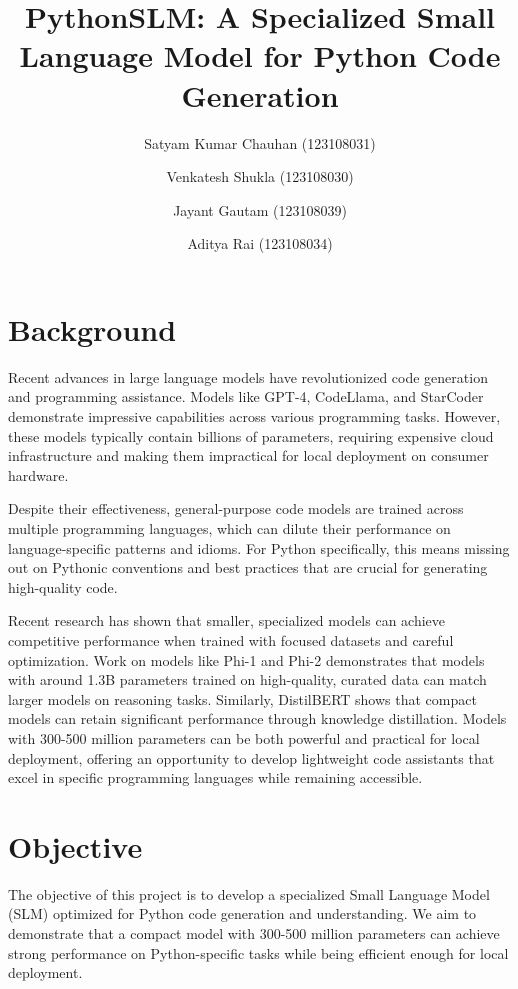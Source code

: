 \documentclass[preprint,12pt]{elsarticle}
\begin{document}
\begin{frontmatter}
\title{PythonSLM: A Specialized Small Language Model for Python Code Generation}

\author{Satyam Kumar Chauhan (123108031)}
\author{Venkatesh Shukla (123108030)}
\author{Jayant Gautam (123108039)}
\author{Aditya Rai (123108034)}

\end{frontmatter}

\section{Background}

Recent advances in large language models have revolutionized code generation and programming assistance. Models like GPT-4, CodeLlama, and StarCoder demonstrate impressive capabilities across various programming tasks. However, these models typically contain billions of parameters, requiring expensive cloud infrastructure and making them impractical for local deployment on consumer hardware.

Despite their effectiveness, general-purpose code models are trained across multiple programming languages, which can dilute their performance on language-specific patterns and idioms. For Python specifically, this means missing out on Pythonic conventions and best practices that are crucial for generating high-quality code.

Recent research has shown that smaller, specialized models can achieve competitive performance when trained with focused datasets and careful optimization. Work on models like Phi-1 and Phi-2 \citep{gunasekar2023phi} demonstrates that models with around 1.3B parameters trained on high-quality, curated data can match larger models on reasoning tasks. Similarly, DistilBERT \citep{sanh2019distilbert} shows that compact models can retain significant performance through knowledge distillation. Models with 300-500 million parameters can be both powerful and practical for local deployment, offering an opportunity to develop lightweight code assistants that excel in specific programming languages while remaining accessible.

\section{Objective}

The objective of this project is to develop a specialized Small Language Model (SLM) optimized for Python code generation and understanding. We aim to demonstrate that a compact model with 300-500 million parameters can achieve strong performance on Python-specific tasks while being efficient enough for local deployment.
\end{document}
